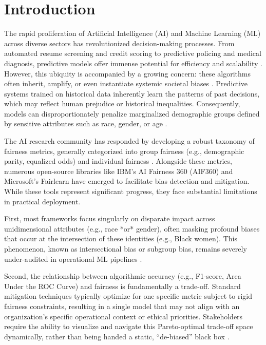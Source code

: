\documentclass[conference]{IEEEtran}
\begin{document}
\section{Introduction}
The rapid proliferation of Artificial Intelligence (AI) and Machine Learning (ML) across diverse sectors has revolutionized decision-making processes. From automated resume screening and credit scoring to predictive policing and medical diagnosis, predictive models offer immense potential for efficiency and scalability \cite{barocas2016big}. However, this ubiquity is accompanied by a growing concern: these algorithms often inherit, amplify, or even instantiate systemic societal biases \cite{mehrabi2021survey}. Predictive systems trained on historical data inherently learn the patterns of past decisions, which may reflect human prejudice or historical inequalities. Consequently, models can disproportionately penalize marginalized demographic groups defined by sensitive attributes such as race, gender, or age \cite{buolamwini2018gender}.

The AI research community has responded by developing a robust taxonomy of fairness metrics, generally categorized into group fairness (e.g., demographic parity, equalized odds) and individual fairness \cite{dwork2012fairness, hardt2016equality}. Alongside these metrics, numerous open-source libraries like IBM's AI Fairness 360 (AIF360) \cite{bellamy2019ai} and Microsoft's Fairlearn \cite{bird2020fairlearn} have emerged to facilitate bias detection and mitigation. While these tools represent significant progress, they face substantial limitations in practical deployment. 

First, most frameworks focus singularly on disparate impact across unidimensional attributes (e.g., race *or* gender), often masking profound biases that occur at the intersection of these identities (e.g., Black women). This phenomenon, known as intersectional bias or subgroup bias, remains severely under-audited in operational ML pipelines \cite{crenshaw1989demarginalizing, kearns2018preventing}.

Second, the relationship between algorithmic accuracy (e.g., F1-score, Area Under the ROC Curve) and fairness is fundamentally a trade-off. Standard mitigation techniques typically optimize for one specific metric subject to rigid fairness constraints, resulting in a single model that may not align with an organization's specific operational context or ethical priorities. Stakeholders require the ability to visualize and navigate this Pareto-optimal trade-off space dynamically, rather than being handed a static, ``de-biased'' black box \cite{corbett2017algorithmic}.
\end{document}
